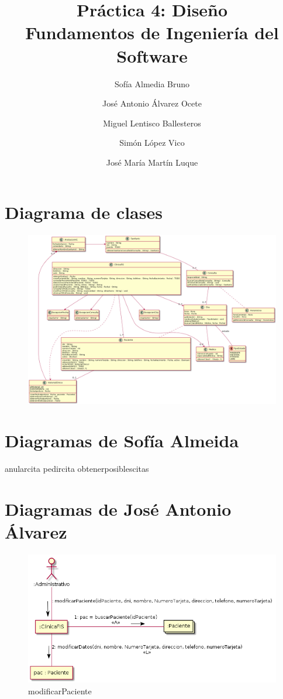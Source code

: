 \documentclass[11pt,a4paper]{article}
\title{Práctica 4: Diseño \large\\ Fundamentos de Ingeniería del Software}
\author{Sofía Almedia Bruno \and José Antonio Álvarez Ocete \and Miguel Lentisco Ballesteros \and Simón López Vico \and José María Martín Luque}
\begin{document}
\maketitle

\section{Diagrama de clases}

\begin{figure}[H]
	\centering
	\includegraphics[width=\textwidth,height=\textheight,keepaspectratio]{Diagramas/diagramaClases}
\end{figure}

\section{Diagramas de Sofía Almeida}
anularcita
pedircita
obtenerposiblescitas

\section{Diagramas de José Antonio Álvarez}

\begin{figure}[H]
	\caption{modificarPaciente}
	\centering
	\includegraphics[width=\textwidth,height=\textheight,keepaspectratio]{Diagramas/modificarPaciente}
\end{figure}
\end{document}
